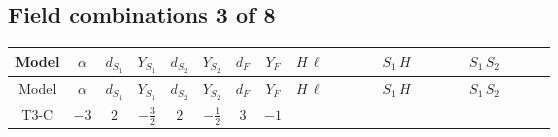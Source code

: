 \documentclass[8pt]{article}
\begin{document}
\begin{landscape}
\subsection*{Field combinations 3 of 8}
\begin{longtable}{@{}cccccccc >{\raggedright\arraybackslash}p{0.21\linewidth} >{\raggedright\arraybackslash}p{0.21\linewidth} >{\raggedright\arraybackslash}p{0.21\linewidth}@{}}
\toprule
Model & $\alpha$ & $d_{S_1}$ & $Y_{S_1}$ & $d_{S_2}$ & $Y_{S_2}$ & $d_F$ & $Y_F$ & $H\,\ell$ & $S_1\,H$ & $S_1\,S_2$ \\
\midrule
\endfirsthead
\toprule
Model & $\alpha$ & $d_{S_1}$ & $Y_{S_1}$ & $d_{S_2}$ & $Y_{S_2}$ & $d_F$ & $Y_F$ & $H\,\ell$ & $S_1\,H$ & $S_1\,S_2$ \\
\midrule
\endhead
T3-C & $-3$ & $2$ & $-\frac{3}{2}$ & $2$ & $-\frac{1}{2}$ & $3$ & $-1$ & \scriptsize\adjustbox{max width=\linewidth}{$\begin{gathered} -\frac{2 \hbar  \overline{y_{1,i_1,r_1}} \overline{y_{2,i_2,r_1}} L_{a_4,i_2}{}^T\, C\, P_L\, L_{a_2,i_1} H_{a_1} H_{a_3} \lambda_5 \epsilon_{a_1,a_2} \epsilon_{a_3,a_4}}{3 \epsilon  M_F} \\ -\frac{2 \hbar  \overline{y_{1,i_1,r_1}} \overline{y_{2,i_2,r_1}} L_{a_4,i_2}{}^T\, C\, P_L\, L_{a_2,i_1} H_{a_1} H_{a_3} \lambda_5 \epsilon_{a_1,a_2} \epsilon_{a_3,a_4}}{3 M_F} \\ -\frac{2 \hbar  \overline{\lambda_5} \overline{L_{a_3,i_1}}\, C\, P_R\, \overline{L_{a_4,i_2}}{}^T y_{1,i_1,r_1} y_{2,i_2,r_1} \epsilon_{a_1,a_3} \epsilon_{a_2,a_4} H_{a_1}{}^{\dagger } H_{a_2}{}^{\dagger }}{3 \epsilon  M_F}\end{gathered}$} & \scriptsize\adjustbox{max width=\linewidth}{$\begin{gathered} -\frac{4 \hbar  \overline{y_{1,i_1,r_1}} \overline{Y_{e,i_2,i_3}} H_{a_1} S_{1,j_1} y_{1,i_2,r_1} Y_{e,i_1,i_3} H_{a_1}{}^{\dagger } S_{1,j_1}{}^{\dagger }}{\sqrt{3} \epsilon } \\ -\frac{4 \hbar  \overline{y_{1,i_1,r_1}} \overline{Y_{e,i_2,i_3}} H_{a_1} S_{1,j_1} y_{1,i_2,r_1} Y_{e,i_1,i_3} H_{a_1}{}^{\dagger } S_{1,j_1}{}^{\dagger }}{\sqrt{3}} \\ +\frac{2 \hbar  \overline{y_{1,i_1,r_1}} \overline{Y_{e,i_2,i_3}} H_{a_2} S_{1,j_2} y_{1,i_2,r_1} Y_{e,i_1,i_3} H_{a_1}{}^{\dagger } S_{1,j_1}{}^{\dagger } \mathcal{I}_{H1,a_1,a_2,j_1,j_2}{}^1}{\sqrt{3} \epsilon }\end{gathered}$} & \scriptsize\adjustbox{max width=\linewidth}{$\begin{gathered} +\frac{2 \hbar  \overline{y_{1,i_1,r_1}} \overline{y_{2,i_2,r_2}} S_{1,j_2} S_{2,j_1} y_{1,i_2,r_1} y_{2,i_1,r_2} S_{1,j_1}{}^{\dagger } S_{2,j_2}{}^{\dagger }}{3 \epsilon } \\ -\frac{10 \hbar  \overline{y_{1,i_1,r_1}} \overline{y_{2,i_2,r_2}} S_{1,j_1} S_{2,j_2} y_{1,i_2,r_1} y_{2,i_1,r_2} S_{1,j_1}{}^{\dagger } S_{2,j_2}{}^{\dagger }}{3 \epsilon } \\ -\frac{10}{3} \hbar  \overline{y_{1,i_1,r_1}} \overline{y_{2,i_2,r_1}} S_{1,j_2} S_{2,j_1} y_{1,i_2,r_2} y_{2,i_1,r_2} S_{1,j_1}{}^{\dagger } S_{2,j_2}{}^{\dagger }\end{gathered}$} \\

\end{longtable}
\end{landscape}
\end{document}
